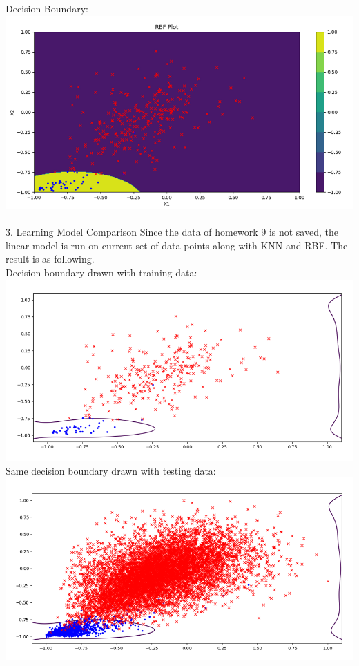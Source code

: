 \documentclass[12pt]{article}
\begin{document}
Decision Boundary:\\
\includegraphics[scale=0.6]{images/rbf_decision_boundary}\\\\
3. Learning Model Comparison
Since the data of homework 9 is not saved, the linear model is run on current set of data points along with KNN and RBF. The result is as following.\\
Decision boundary drawn with training data:\\
\includegraphics[scale=0.6]{images/linear_train}\\
Same decision boundary drawn with testing data:\\
\includegraphics[scale=0.6]{images/linear_test}\\
\end{document}
